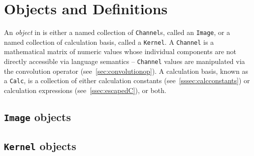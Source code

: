 \section{Objects and Definitions}
\label{sec:objdef}
An \emph{object} in \sys{} is either a named collection of \texttt{Channel}s, called an
\texttt{Image}, or a named collection of calculation basis, called a
\texttt{Kernel}. A \texttt{Channel} is a mathematical matrix of numeric values
whose individual components are not directly accessible via \sys{} language
semantics -- \texttt{Channel} values are manipulated via the convolution
operator (see~\ref{sec:convolutionop}). A calculation basis, known as a
\texttt{Calc}, is a collection of either calculation constants
(see~\ref{sssec:calcconstants}) or calculation expressions (see~\ref{ssec:escapedC}),
or both.

\subsection{\texttt{Image} objects}
\label{ssec:images}


\subsection{\texttt{Kernel} objects}
\label{ssec:kernels}

